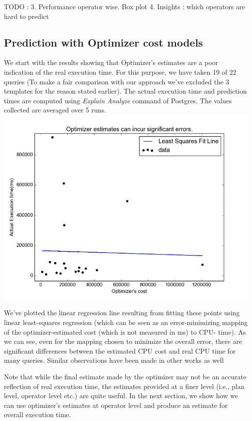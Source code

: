 \documentclass{article}
\begin{document}
\begin{multicols}{2}
\begin{itemize}
	TODO : 
	3. Performance operator wise. Box plot
	4. Insights : which operators are hard to predict
	
	\end{itemize}		
	
	\subsection{Prediction with Optimizer cost models}		
	We start with the results showing that Optimizer's estimates are a poor indication of the real
	execution time. For this purpose, we have taken 19 of 22 queries (To make a fair comparison with 
	our approach we've excluded the 3 templates for the reason stated earlier). The actual execution time
	and prediction times are computed using \textit{Explain Analyze} command of Postgres. The values 			collected are averaged over 5 runs.
	\includegraphics[scale=0.45]{optcost.png}
	
	We've plotted the linear regression line resulting from fitting these points 
	using linear least-squares regression 
	(which can be seen as an error-minimizing mapping of the
	optimizer-estimated cost (which is not measured in ms) to CPU-
	time). As we can see, even for the mapping chosen to minimize
	the overall error, there are significant differences between the estimated CPU cost 
	and real CPU time for many queries. Similar
	observations have been made in other works as well \cite{MSR,ICDE2012}

	Note that while the final estimate made by the optimizer may not be an accurate reflection of
	real execution time, the estimates provided at a finer level (i.e., plan level, operator level etc.) 
	are quite useful. In the next section, we show how we can use optimizer's estimates at operator level 
	and produce an estimate for overall execution time.
		

\end{multicols}
\end{document}
